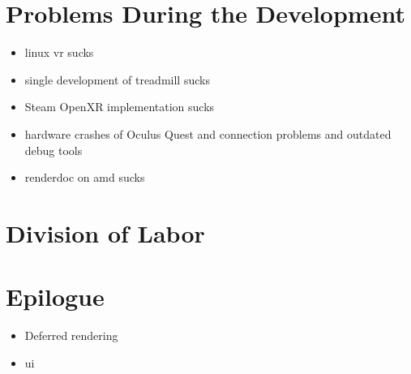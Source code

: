 \newpage
\section{Problems During the Development}
\label{sec:problems}
\begin{itemize}
    \item linux vr sucks
    \item single development of treadmill sucks
    \item Steam OpenXR implementation sucks
    \item hardware crashes of Oculus Quest and connection problems and outdated debug tools
    \item renderdoc on amd sucks
\end{itemize}
\newpage
\section{Division of Labor}
\section{Epilogue}
\begin{itemize}
    \item Deferred rendering
    \item ui
\end{itemize}